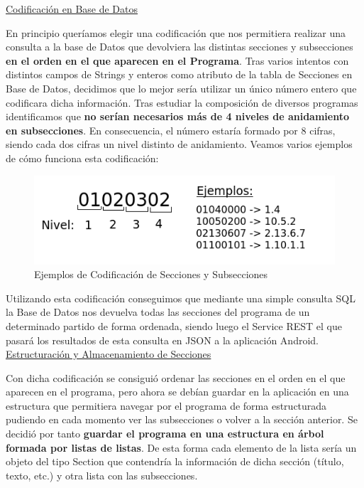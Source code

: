 		\underline{Codificación en Base de Datos}
		
		En principio queríamos elegir una codificación que nos permitiera realizar una consulta a la base de Datos que devolviera las distintas secciones y subsecciones \textbf{en el orden en el que aparecen en el Programa}. Tras varios intentos con distintos campos de Strings y enteros como atributo de la tabla de Secciones en Base de Datos, decidimos que lo mejor sería utilizar un único número entero que codificara dicha información. Tras estudiar la composición de diversos programas identificamos que \textbf{no serían necesarios más de 4 niveles de anidamiento en subsecciones}. En consecuencia, el número estaría formado por 8 cifras, siendo cada dos cifras un nivel distinto de anidamiento. Veamos varios ejemplos de cómo funciona esta codificación:
		
	\begin{figure}[H]
	  \centering
	    \includegraphics[keepaspectratio, scale=0.8]{Media/Captures/sectionsCodification.png}
	  \caption{Ejemplos de Codificación de Secciones y Subsecciones}
	  \label{fig:secCodification}
	\end{figure}	
	
	Utilizando esta codificación conseguimos que mediante una simple consulta SQL la Base de Datos nos devuelva todas las secciones del programa de un determinado partido de forma ordenada, siendo luego el Service REST el que pasará los resultados de esta consulta en JSON a la aplicación Android. \\ 
	
	\underline{Estructuración y Almacenamiento de Secciones}
	
	Con dicha codificación se consiguió ordenar las secciones en el orden en el que aparecen en el programa, pero ahora se debían guardar en la aplicación en una estructura que permitiera navegar por el programa de forma estructurada pudiendo en cada momento ver las subsecciones o volver a la sección anterior. Se decidió por tanto \textbf{guardar el programa en una estructura en árbol formada por listas de listas}. De esta forma cada elemento de la lista sería un objeto del tipo Section que contendría la información de dicha sección (título, texto, etc.) y otra lista con las subsecciones.
	

